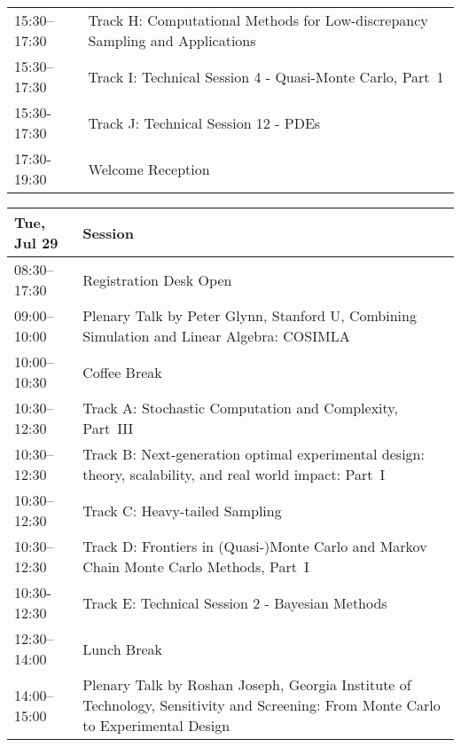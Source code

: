 \begin{table}
{\begin{tabularx}{\textwidth}{>{\hsize=0.32\hsize}X|>{\hsize=1.7\hsize}X}
\cellcolor{\SessionTitleColor}15:30–17:30 & \cellcolor{\SessionTitleColor}Track H: Computational Methods for Low-discrepancy Sampling and Applications \\
\cellcolor{\SessionLightColor}15:30–17:30 & \cellcolor{\SessionLightColor}Track I: Technical Session 4 - Quasi-Monte Carlo, Part~1 \\
\cellcolor{\SessionLightColor}15:30-17:30 & \cellcolor{\SessionLightColor}Track J: Technical Session 12 - PDEs \\
\cellcolor{\EmptyColor}17:30-19:30 & \cellcolor{\EmptyColor}Welcome Reception \\
\hline
\end{tabularx}
}
\end{table}

\begin{table}
{\footnotesize
\begin{tabularx}{\textwidth}{>{\hsize=0.32\hsize}X|>{\hsize=1.7\hsize}X}
\hline
\textbf{Tue, Jul 29} & \textbf{Session} \\
\hline
\cellcolor{\EmptyColor}08:30–17:30 & \cellcolor{\EmptyColor}Registration Desk Open \\
\cellcolor{\PlenaryColor}09:00–10:00 & \cellcolor{\PlenaryColor}Plenary Talk by Peter Glynn, Stanford U, Combining Simulation and Linear Algebra: COSIMLA \\
\cellcolor{\EmptyColor}10:00–10:30 & \cellcolor{\EmptyColor}Coffee Break \\
\cellcolor{\SessionTitleColor}10:30–12:30 & \cellcolor{\SessionTitleColor}Track A: Stochastic Computation and Complexity, Part~III \\
\cellcolor{\SessionTitleColor}10:30–12:30 & \cellcolor{\SessionTitleColor}Track B: Next-generation optimal experimental design: theory, scalability, and real world impact: Part~I \\
\cellcolor{\SessionTitleColor}10:30–12:30 & \cellcolor{\SessionTitleColor}Track C: Heavy-tailed Sampling \\
\cellcolor{\SessionTitleColor}10:30–12:30 & \cellcolor{\SessionTitleColor}Track D: Frontiers in (Quasi-)Monte Carlo and Markov Chain Monte Carlo Methods, Part~I \\
\cellcolor{\SessionLightColor}10:30-12:30 & \cellcolor{\SessionLightColor}Track E: Technical Session 2 - Bayesian Methods \\
\cellcolor{\EmptyColor}12:30–14:00 & \cellcolor{\EmptyColor}Lunch Break \\
\cellcolor{\PlenaryColor}14:00–15:00 & \cellcolor{\PlenaryColor}Plenary Talk by Roshan Joseph, Georgia Institute of Technology, Sensitivity and Screening: From Monte Carlo to Experimental Design \\

\end{tabularx}}
\end{table}
